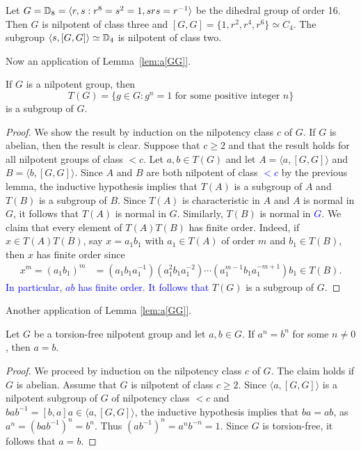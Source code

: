 \begin{example}
	Let $G=\mathbb{D}_{8}=\langle r,s:r^{8}=s^2=1,srs=r^{-1}\rangle$ be the dihedral group of order 
	16. Then $G$ is nilpotent of class three and 
	$[G,G]=\{1,r^2,r^4,r^6\}\simeq C_4$. The subgroup $\langle
	s,[G,G]\rangle\simeq\mathbb{D}_4$ is nilpotent of class two.
\end{example}

Now an application of Lemma~\ref{lem:a[GG]}. 

\begin{theorem}
	\label{thm:T(nilpotent)}
	If $G$ is a nilpotent group, then 
	\[
	T(G)=\{g\in G:g^n=1\text{ for some positive integer }n\}
	\]
	is a subgroup of $G$. 
\end{theorem}

\begin{proof} 
    We show the result by induction on the nilpotency class $c$ of $G$.
    If $G$ is abelian, then the result is clear. Suppose that $c\geq 2$ and that the result holds for all nilpotent 
    groups of class $<c$. 
	Let $a,b\in T(G)$ and let $A=\langle a,[G,G]\rangle$ and $B=\langle b,[G,G]\rangle$. 
	Since $A$ and $B$ are both nilpotent of class \textcolor{blue}{$<c$} by the previous lemma, the inductive hypothesis implies that
	$T(A)$ is a subgroup of $A$ and $T(B)$ is a subgroup of $B$. 
	Since $T(A)$ is characteristic in $A$ and $A$ is normal in $G$, it follows that 
	$T(A)$ is
	normal in $G$. Similarly, $T(B)$ is normal in \textcolor{blue}{$G$}.  
	We claim that every element of $T(A)T(B)$ has finite order. Indeed, if 
	$x\in T(A)T(B)$, say $x=a_1b_1$ with 
	$a_1\in T(A)$ of order $m$ and $b_1\in T(B)$, then $x$ has finite order since  
	\begin{align*}
	x^m=(a_1b_1)^m&=
		(a_1b_1a_1^{-1})(a_1^2b_1a_1^{-2})\cdots (a_1^{m-1} b_1 a_1^{-m+1})b_1\in T(B).
	\end{align*}
	\textcolor{blue}{In particular, $ab$ has finite order. It follows that} 
	$T(G)$ is a subgroup of $G$. 
\end{proof}

Another application of Lemma \ref{lem:a[GG]}.

\begin{theorem}
	\label{thm:a=b}
	Let $G$ be a torsion-free nilpotent group and let $a,b\in G$. If $a^n=b^n$ for some 
	$n\ne 0$, then $a=b$.
\end{theorem}

\begin{proof}
	We proceed by induction on the nilpotency class $c$ of $G$. The claim holds if $G$ is abelian. Assume 
	that $G$ is nilpotent of class $c\geq2$. Since $\langle a,[G,G]\rangle$ is a nilpotent subgroup of
	$G$ of nilpotency class $<c$ and $bab^{-1}=[b,a]a\in \langle
	a,[G,G]\rangle$, the inductive hypothesis implies that $ba=ab$, as  
	$a^n=(bab^{-1})^n=b^n$. Thus $(ab^{-1})^n=a^nb^{-n}=1$. Since $G$ is torsion-free, it follows that $a=b$.
\end{proof}

